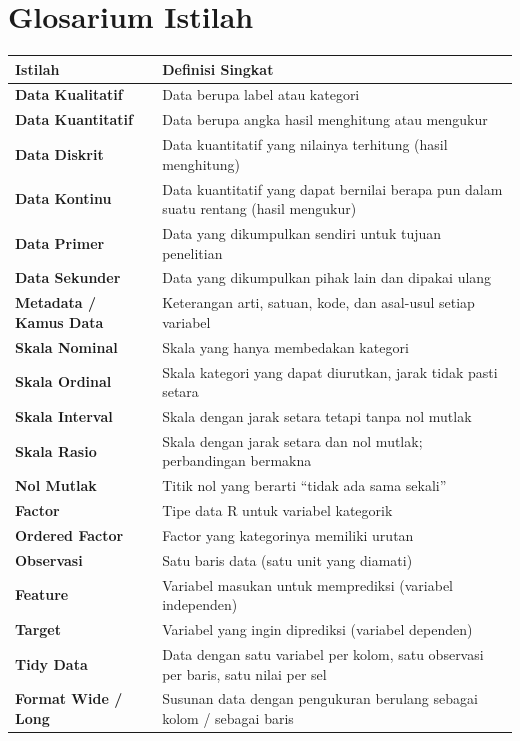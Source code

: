 \documentclass[
  indonesian,
  letterpaper,
]{book}
\newcounter{none} %
\begin{document}
\section{Glosarium Istilah}\label{glosarium-istilah-1}

{\def\LTcaptype{none} %
\begin{longtable}[]{@{}
  >{\raggedright\arraybackslash}p{}
  >{\raggedright\arraybackslash}p{}@{}}
\toprule\noalign{}
\begin{minipage}[b]{\linewidth}\raggedright
Istilah
\end{minipage} & \begin{minipage}[b]{\linewidth}\raggedright
Definisi Singkat
\end{minipage} \\
\midrule\noalign{}
\endhead
\bottomrule\noalign{}
\endlastfoot
\textbf{Data Kualitatif} & Data berupa label atau kategori \\
\textbf{Data Kuantitatif} & Data berupa angka hasil menghitung atau
mengukur \\
\textbf{Data Diskrit} & Data kuantitatif yang nilainya terhitung (hasil
menghitung) \\
\textbf{Data Kontinu} & Data kuantitatif yang dapat bernilai berapa pun
dalam suatu rentang (hasil mengukur) \\
\textbf{Data Primer} & Data yang dikumpulkan sendiri untuk tujuan
penelitian \\
\textbf{Data Sekunder} & Data yang dikumpulkan pihak lain dan dipakai
ulang \\
\textbf{Metadata / Kamus Data} & Keterangan arti, satuan, kode, dan
asal-usul setiap variabel \\
\textbf{Skala Nominal} & Skala yang hanya membedakan kategori \\
\textbf{Skala Ordinal} & Skala kategori yang dapat diurutkan, jarak
tidak pasti setara \\
\textbf{Skala Interval} & Skala dengan jarak setara tetapi tanpa nol
mutlak \\
\textbf{Skala Rasio} & Skala dengan jarak setara dan nol mutlak;
perbandingan bermakna \\
\textbf{Nol Mutlak} & Titik nol yang berarti ``tidak ada sama
sekali'' \\
\textbf{Factor} & Tipe data R untuk variabel kategorik \\
\textbf{Ordered Factor} & Factor yang kategorinya memiliki urutan \\
\textbf{Observasi} & Satu baris data (satu unit yang diamati) \\
\textbf{Feature} & Variabel masukan untuk memprediksi (variabel
independen) \\
\textbf{Target} & Variabel yang ingin diprediksi (variabel dependen) \\
\textbf{Tidy Data} & Data dengan satu variabel per kolom, satu observasi
per baris, satu nilai per sel \\
\textbf{Format Wide / Long} & Susunan data dengan pengukuran berulang
sebagai kolom / sebagai baris \\
\end{longtable}
}
\end{document}
